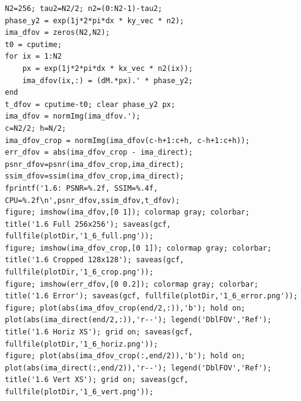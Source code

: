 \documentclass[12pt,a4paper]{article}
\begin{document}
\begin{lstlisting}[style=matlab]
N2=256; tau2=N2/2; n2=(0:N2-1)-tau2;
phase_y2 = exp(1j*2*pi*dx * ky_vec * n2);
ima_dfov = zeros(N2,N2);
t0 = cputime;
for ix = 1:N2
    px = exp(1j*2*pi*dx * kx_vec * n2(ix));
    ima_dfov(ix,:) = (dM.*px).' * phase_y2;
end
t_dfov = cputime-t0; clear phase_y2 px;
ima_dfov = normImg(ima_dfov.');
c=N2/2; h=N/2;
ima_dfov_crop = normImg(ima_dfov(c-h+1:c+h, c-h+1:c+h));
err_dfov = abs(ima_dfov_crop - ima_direct);
psnr_dfov=psnr(ima_dfov_crop,ima_direct); ssim_dfov=ssim(ima_dfov_crop,ima_direct);
fprintf('1.6: PSNR=%.2f, SSIM=%.4f, CPU=%.2f\n',psnr_dfov,ssim_dfov,t_dfov);
figure; imshow(ima_dfov,[0 1]); colormap gray; colorbar;
title('1.6 Full 256x256'); saveas(gcf, fullfile(plotDir,'1_6_full.png'));
figure; imshow(ima_dfov_crop,[0 1]); colormap gray; colorbar;
title('1.6 Cropped 128x128'); saveas(gcf, fullfile(plotDir,'1_6_crop.png'));
figure; imshow(err_dfov,[0 0.2]); colormap gray; colorbar;
title('1.6 Error'); saveas(gcf, fullfile(plotDir,'1_6_error.png'));
figure; plot(abs(ima_dfov_crop(end/2,:)),'b'); hold on;
plot(abs(ima_direct(end/2,:)),'r--'); legend('DblFOV','Ref');
title('1.6 Horiz XS'); grid on; saveas(gcf, fullfile(plotDir,'1_6_horiz.png'));
figure; plot(abs(ima_dfov_crop(:,end/2)),'b'); hold on;
plot(abs(ima_direct(:,end/2)),'r--'); legend('DblFOV','Ref');
title('1.6 Vert XS'); grid on; saveas(gcf, fullfile(plotDir,'1_6_vert.png'));
\end{lstlisting}
\end{document}
